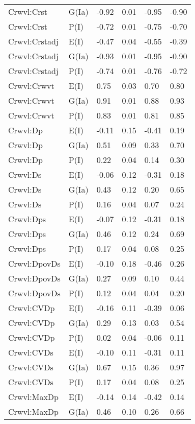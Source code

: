 \begin{center}
\begin{longtable}{|p{1.1in}|p{0.7in}|p{0.7in}|p{0.6in}|p{0.6in}|p{0.6in}|}
  Crwvl:Crst & G(Ia) & -0.92 & 0.01 & -0.95 & -0.90 \\ 
  Crwvl:Crst & P(I) & -0.72 & 0.01 & -0.75 & -0.70 \\ 
  Crwvl:Crstadj & E(I) & -0.47 & 0.04 & -0.55 & -0.39 \\ 
  Crwvl:Crstadj & G(Ia) & -0.93 & 0.01 & -0.95 & -0.90 \\ 
  Crwvl:Crstadj & P(I) & -0.74 & 0.01 & -0.76 & -0.72 \\ 
  Crwvl:Crwvt & E(I) & 0.75 & 0.03 & 0.70 & 0.80 \\ 
  Crwvl:Crwvt & G(Ia) & 0.91 & 0.01 & 0.88 & 0.93 \\ 
  Crwvl:Crwvt & P(I) & 0.83 & 0.01 & 0.81 & 0.85 \\ 
  Crwvl:Dp & E(I) & -0.11 & 0.15 & -0.41 & 0.19 \\ 
  Crwvl:Dp & G(Ia) & 0.51 & 0.09 & 0.33 & 0.70 \\ 
  Crwvl:Dp & P(I) & 0.22 & 0.04 & 0.14 & 0.30 \\ 
  Crwvl:Ds & E(I) & -0.06 & 0.12 & -0.31 & 0.18 \\ 
  Crwvl:Ds & G(Ia) & 0.43 & 0.12 & 0.20 & 0.65 \\ 
  Crwvl:Ds & P(I) & 0.16 & 0.04 & 0.07 & 0.24 \\ 
  Crwvl:Dps & E(I) & -0.07 & 0.12 & -0.31 & 0.18 \\ 
  Crwvl:Dps & G(Ia) & 0.46 & 0.12 & 0.24 & 0.69 \\ 
  Crwvl:Dps & P(I) & 0.17 & 0.04 & 0.08 & 0.25 \\ 
  Crwvl:DpovDs & E(I) & -0.10 & 0.18 & -0.46 & 0.26 \\ 
  Crwvl:DpovDs & G(Ia) & 0.27 & 0.09 & 0.10 & 0.44 \\ 
  Crwvl:DpovDs & P(I) & 0.12 & 0.04 & 0.04 & 0.20 \\ 
  Crwvl:CVDp & E(I) & -0.16 & 0.11 & -0.39 & 0.06 \\ 
  Crwvl:CVDp & G(Ia) & 0.29 & 0.13 & 0.03 & 0.54 \\ 
  Crwvl:CVDp & P(I) & 0.02 & 0.04 & -0.06 & 0.11 \\ 
  Crwvl:CVDs & E(I) & -0.10 & 0.11 & -0.31 & 0.11 \\ 
  Crwvl:CVDs & G(Ia) & 0.67 & 0.15 & 0.36 & 0.97 \\ 
  Crwvl:CVDs & P(I) & 0.17 & 0.04 & 0.08 & 0.25 \\ 
  Crwvl:MaxDp & E(I) & -0.14 & 0.14 & -0.42 & 0.14 \\ 
  Crwvl:MaxDp & G(Ia) & 0.46 & 0.10 & 0.26 & 0.66 \\ 

\end{longtable}
\end{center}

